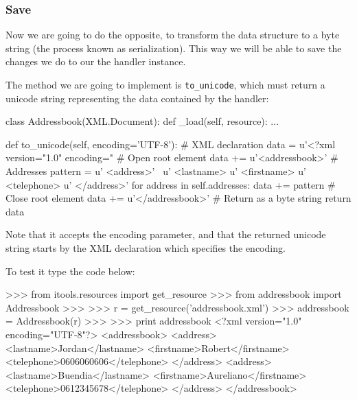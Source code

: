 \subsubsection{Save}

Now we are going to do the opposite, to transform the data structure to
a byte string (the process known as serialization). This way we will be
able to save the changes we do to our the handler instance.

The method we are going to implement is {\tt to\_unicode}, which must return
a unicode string representing the data contained by the handler:

\begin{code}
    class Addressbook(XML.Document):
        def _load(self, resource):
            ...


        def to_unicode(self, encoding='UTF-8'):
            # XML declaration
            data = u'<?xml version="1.0" encoding="%
            # Open root element
            data += u'<addressbook>\n'
            # Addresses
            pattern = u'  <address>\n' \
                      u'    <lastname>%
                      u'    <firstname>%
                      u'    <telephone>%
                      u'  </address>\n'
            for address in self.addresses:
                data += pattern %
            # Close root element
            data += u'</addressbook>'
            # Return as a byte string
            return data
\end{code}

Note that it accepts the encoding parameter, and that the returned unicode
string starts by the XML declaration which specifies the encoding.

To test it type the code below:

\begin{code}
    >>> from itools.resources import get_resource
    >>> from addressbook import Addressbook
    >>>
    >>> r = get_resource('addressbook.xml')
    >>> addressbook = Addressbook(r)
    >>>
    >>> print addressbook
    <?xml version="1.0" encoding="UTF-8"?>
    <addressbook>
      <address>
        <lastname>Jordan</lastname>
        <firstname>Robert</firstname>
        <telephone>0606060606</telephone>
      </address>
      <address>
        <lastname>Buendia</lastname>
        <firstname>Aureliano</firstname>
        <telephone>0612345678</telephone>
      </address>
    </addressbook>
\end{code}

